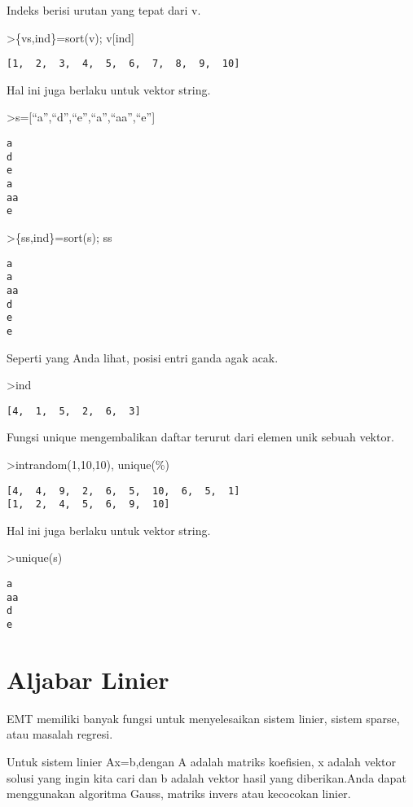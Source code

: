 \documentclass[
]{book}
\begin{document}
Indeks berisi urutan yang tepat dari v.

\textgreater\{vs,ind\}=sort(v); v{[}ind{]}

\begin{verbatim}
[1,  2,  3,  4,  5,  6,  7,  8,  9,  10]
\end{verbatim}

Hal ini juga berlaku untuk vektor string.

\textgreater s={[}``a'',``d'',``e'',``a'',``aa'',``e''{]}

\begin{verbatim}
a
d
e
a
aa
e
\end{verbatim}

\textgreater\{ss,ind\}=sort(s); ss

\begin{verbatim}
a
a
aa
d
e
e
\end{verbatim}

Seperti yang Anda lihat, posisi entri ganda agak acak.

\textgreater ind

\begin{verbatim}
[4,  1,  5,  2,  6,  3]
\end{verbatim}

Fungsi unique mengembalikan daftar terurut dari elemen unik sebuah vektor.

\textgreater intrandom(1,10,10), unique(\%)

\begin{verbatim}
[4,  4,  9,  2,  6,  5,  10,  6,  5,  1]
[1,  2,  4,  5,  6,  9,  10]
\end{verbatim}

Hal ini juga berlaku untuk vektor string.

\textgreater unique(s)

\begin{verbatim}
a
aa
d
e
\end{verbatim}

\section{Aljabar Linier}\label{aljabar-linier}

EMT memiliki banyak fungsi untuk menyelesaikan sistem linier, sistem sparse, atau masalah regresi.

Untuk sistem linier Ax=b,dengan A adalah matriks koefisien, x adalah vektor solusi yang ingin kita cari dan b adalah vektor hasil yang diberikan.Anda dapat menggunakan algoritma Gauss, matriks invers atau kecocokan linier.
\end{document}
